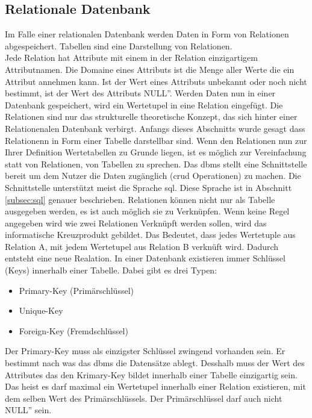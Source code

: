 \subsection{Relationale Datenbank}\label{subsec:relDB}
Im Falle einer relationalen Datenbank werden Daten in Form von Relationen abgespeichert.
Tabellen sind eine Darstellung von Relationen.\\
Jede Relation hat Attribute mit einem in der Relation einzigartigem Attributnamen.
Die Domaine eines Attributs ist die Menge aller Werte die ein Attribut annehmen kann.
Ist der Wert eines Attributs unbekannt oder noch nicht bestimmt, ist der Wert des Attributs \glqq{}NULL''\citep{Studer:2016:2}.
Werden Daten nun in einer Datenbank gespeichert, wird ein Wertetupel in eine Relation eingefügt.
Die Relationen sind nur das strukturelle theoretische Konzept, das sich hinter einer Relationenalen Datenbank verbirgt.
Anfangs dieses Abschnitts wurde gesagt dass Relationenn in Form einer Tabelle darstellbar sind.
Wenn den Relationen nun zur Ihrer Definition Wertetabellen zu Grunde liegen, 
ist es möglich zur Vereinfachung statt von Relationen, von Tabellen zu sprechen.
Das \ac{dbms} stellt eine Schnittstelle bereit um dem Nutzer die Daten zugänglich (\ac{crud} Operationen) zu machen.
Die Schnittstelle unterstützt meist die Sprache \ac{sql}. Diese Sprache ist in Abschnitt \ref{subsec:sql} genauer beschrieben.
Relationen können nicht nur als Tabelle ausgegeben werden, es ist auch möglich sie zu Verknüpfen.
Wenn keine Regel angegeben wird wie zwei Relationen Verknüpft werden sollen, wird das informatische Kreuzprodukt gebildet.
Das Bedeutet, dass jedes Wertetuple aus Relation A, mit jedem Wertetupel aus Relation B verknüft wird. 
Dadurch entsteht eine neue Realation.
In einer Datenbank existieren immer Schlüssel (Keys) innerhalb einer Tabelle.
Dabei gibt es drei Typen:
\begin{itemize}
  \item Primary-Key (Primärschlüssel)
  \item Unique-Key
  \item Foreign-Key (Fremdschlüssel)
\end{itemize}
Der Primary-Key muss als einzigster Schlüssel zwingend vorhanden sein. Er bestimmt nach was das \ac{dbms} die Datensätze ablegt.
Desshalb muss der Wert des Attributes das den Krimary-Key bildet innerhalb einer Tabelle einzigartig sein.
Das heist es darf maximal ein Wertetupel innerhalb einer Relation existieren, mit dem selben Wert des Primärschlüssels.
Der Primärschlüssel darf auch nicht \glqq{}NULL'' sein.
